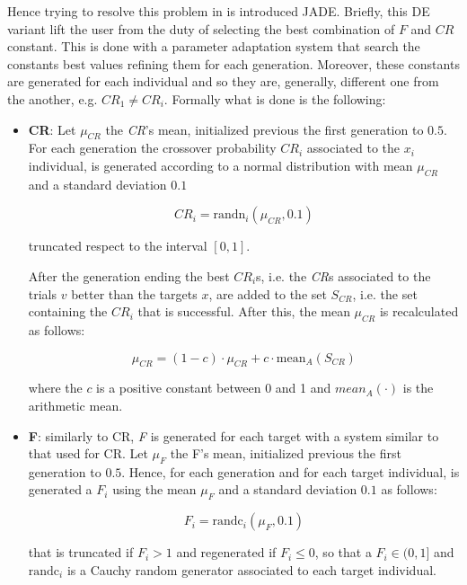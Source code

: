 Hence trying to resolve this problem in \cite{JADE:2009} is introduced JADE. Briefly, this DE variant lift the user from the duty of selecting the best combination of $F$ and $CR$ constant. This is done with a parameter adaptation system that search the constants best values refining them for each generation. Moreover, these constants are generated for each individual and so they are, generally, different one from the another, e.g. $\textit{CR}_{1} \neq \textit{CR}_{i}$. Formally what is done is the following:
\begin{itemize}
	\item{\textbf{CR}: Let $\mu_{\textit{CR}}$ the \textit{CR}'s mean, initialized previous the first generation to $0.5$. For each generation the crossover probability $\textit{CR}_{i}$ associated to the $x_{i}$ individual, is generated according to a normal distribution with mean $\mu_{CR}$ and a standard deviation $0.1$
	\begin{center}
		\begin{equation}
			\textit{CR}_{i} = \textrm{randn}_{i}(\mu_{\textit{CR}}, 0.1)
		\end{equation}
	\end{center}
	truncated respect to the interval $[0, 1]$. 
	
	
	After the generation ending the best $\textit{CR}_{i}$s, i.e. the \textit{CR}s associated to the trials $v$ better than the targets $x$, are added to the set $S_{\textit{CR}}$, i.e. the set containing the $\textit{CR}_{i}$ that is successful. After this, the mean $\mu_{\textit{CR}}$ is recalculated as follows:
	\begin{center}
		\begin{equation}
			\mu_{\textit{CR}} = (1 - c)\cdot\mu_{\textit{CR}} + c\cdot\textrm{mean}_{A}(S_{\textit{CR}})
		\end{equation}
	\end{center}
	where the $c$ is a positive constant between 0 and 1 and $mean_{A}(\cdot)$ is the arithmetic mean.	
	}
	\item{\textbf{F}: similarly to CR, \textit{F} is generated for each target with a system similar to that used for CR. Let $\mu_{F}$ the F's mean, initialized previous the first generation to $0.5$. Hence, for each generation and for each target individual, is generated a $F_{i}$ using the mean $\mu_{F}$ and a standard deviation $0.1$ as follows:
		\begin{center}
			\begin{equation}
				F_{i} = \textrm{randc}_{i}(\mu_{F}, 0.1)
			\end{equation}
		\end{center}
		that is truncated if $F_{i} > 1$ and regenerated if $F_{i} \leq 0$, so that a $F_{i} \in (0, 1]$ and $\textrm{randc}_{i}$ is a Cauchy random generator associated to each target individual.
		
}
\end{itemize}
